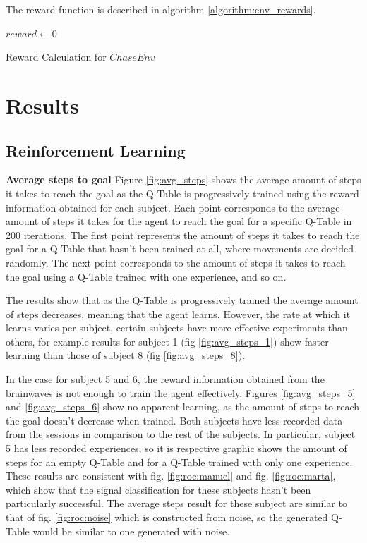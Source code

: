 \documentclass[journal]{IEEEtran}
\begin{document}
{{The reward function is described in algorithm \ref{algorithm:env_rewards}.

\begin{algorithm}
\SetAlgoLined
\DontPrintSemicolon
$reward \leftarrow 0$\\
\label{algorithm:env_rewards}
\caption{Reward Calculation for $ChaseEnv$}
\end{algorithm}
}
}



\section{Results}


\subsection{Reinforcement Learning}

\textbf{Average steps to goal}
Figure \ref{fig:avg_steps} shows the average amount of steps it takes to reach the goal as the Q-Table is progressively trained using the reward information obtained for each subject. Each point corresponds to the average amount of steps it takes for the agent to reach the goal for a specific Q-Table in 200 iterations. The first point represents the amount of steps it takes to reach the goal for a Q-Table that hasn't been trained at all, where movements are decided randomly. The next point corresponds to the amount of steps it takes to reach the goal using a Q-Table trained with one experience, and so on.

The results show that as the Q-Table is progressively trained the average amount of steps decreases, meaning that the agent learns. However, the rate at which it learns varies per subject, certain subjects have more effective experiments than others, for example results for subject 1 (fig \ref{fig:avg_steps_1}) show faster learning than those of subject 8 (fig \ref{fig:avg_steps_8}).

In the case for subject 5 and 6, the reward information obtained from the brainwaves is not enough to train the agent effectively. Figures \ref{fig:avg_steps_5} and \ref{fig:avg_steps_6} show no apparent learning, as the amount of steps to reach the goal doesn't decrease when trained. Both subjects have less recorded data from the sessions in comparison to the rest of the subjects. In particular, subject 5 has less recorded experiences, so it is respective graphic shows the amount of steps for an empty Q-Table and for a Q-Table trained with only one experience. These results are consistent with fig. \ref{fig:roc:manuel} and fig. \ref{fig:roc:marta}, which show that the signal classification for these subjects hasn't been particularly successful. The average steps result for these subject are similar to that of fig. \ref{fig:roc:noise} which is constructed from noise, so the generated Q-Table would be similar to one generated with noise.
\end{document}
